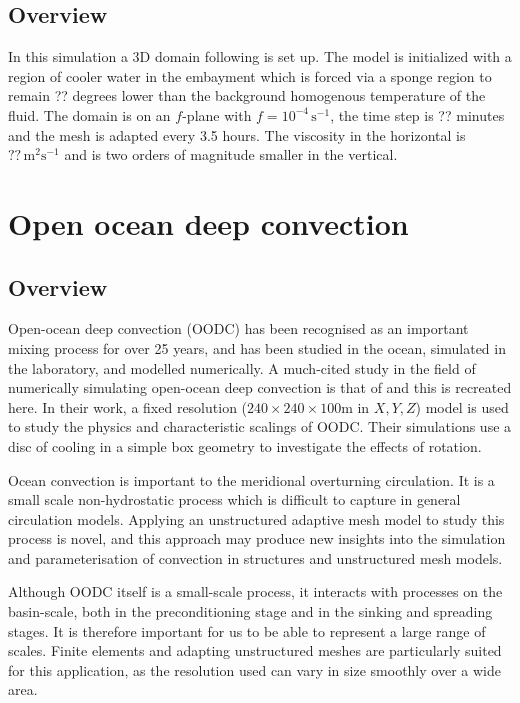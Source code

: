 \subsection{Overview}
In this simulation a 3D domain following \cite{DOME} is set
up. The model is initialized with a region of cooler water in the
embayment which is forced via a sponge region to remain ?? degrees
lower than the background homogenous temperature of the fluid.  The
domain is on an $f$-plane with $f=10^{-4}\,\textrm{s}^{-1}$, the time step is ??
minutes and the mesh is adapted every 3.5 hours. The viscosity in the
horizontal is $??\,\textrm{m}^{2}\textrm{s}^{-1}$ and is two orders of magnitude smaller
in the vertical. 



\section{Open ocean deep convection}
\label{sect:OODC}
\subsection{Overview}
Open-ocean deep convection (OODC) has been recognised as an
important mixing process for over 25 years, and
has been studied in the ocean, simulated in the laboratory, and modelled numerically.
A much-cited study in the field of numerically simulating
open-ocean deep convection is that of \cite{jones1993} and this is recreated here.
In their work, a fixed resolution ($240 \times 240 \times
100$m in $X, Y, Z$) model is used to study the physics and
characteristic scalings of OODC. Their simulations use a disc
of cooling in a simple box geometry to investigate the effects of rotation.

Ocean convection is important to the meridional overturning
circulation. It is a small scale non-hydrostatic process which
is difficult to capture in general circulation models. Applying
an unstructured adaptive mesh model to study this process is
novel, and this approach may produce new insights into the
simulation and parameterisation of convection in structures and
unstructured mesh models.

Although OODC itself is a small-scale process, it interacts with
processes on the basin-scale, both in the preconditioning stage and
in the sinking and spreading stages. It is therefore important for us
to be able to represent a large range of scales. Finite elements and adapting
unstructured meshes are particularly suited for this application, as the
resolution used can vary in size smoothly over a wide area.

